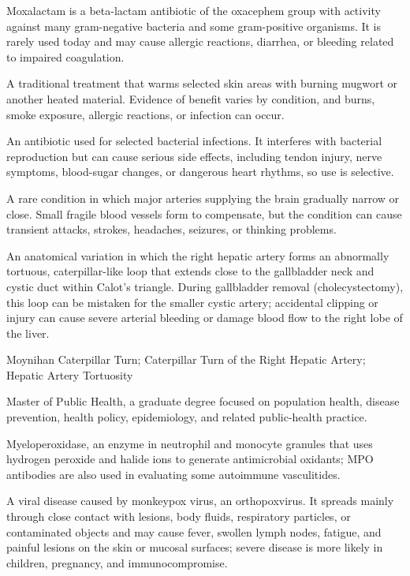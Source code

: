  Moxalactam is a beta-lactam antibiotic of the oxacephem group with activity against many gram-negative bacteria and some gram-positive organisms. It is rarely used today and may cause allergic reactions, diarrhea, or bleeding related to impaired coagulation.

 A traditional treatment that warms selected skin areas with burning mugwort or another heated material. Evidence of benefit varies by condition, and burns, smoke exposure, allergic reactions, or infection can occur.

 An antibiotic used for selected bacterial infections. It interferes with bacterial reproduction but can cause serious side effects, including tendon injury, nerve symptoms, blood-sugar changes, or dangerous heart rhythms, so use is selective.

 A rare condition in which major arteries supplying the brain gradually narrow or close. Small fragile blood vessels form to compensate, but the condition can cause transient attacks, strokes, headaches, seizures, or thinking problems.

 An anatomical variation in which the right hepatic artery forms an abnormally tortuous, caterpillar-like loop that extends close to the gallbladder neck and cystic duct within Calot's triangle. During gallbladder removal (cholecystectomy), this loop can be mistaken for the smaller cystic artery; accidental clipping or injury can cause severe arterial bleeding or damage blood flow to the right lobe of the liver.

\synonyms
Moynihan Caterpillar Turn; Caterpillar Turn of the Right Hepatic Artery; Hepatic Artery Tortuosity

 Master of Public Health, a graduate degree focused on population health, disease prevention, health policy, epidemiology, and related public-health practice.

 Myeloperoxidase, an enzyme in neutrophil and monocyte granules that uses hydrogen peroxide and halide ions to generate antimicrobial oxidants; MPO antibodies are also used in evaluating some autoimmune vasculitides.

 A viral disease caused by monkeypox virus, an orthopoxvirus. It spreads mainly through close contact with lesions, body fluids, respiratory particles, or contaminated objects and may cause fever, swollen lymph nodes, fatigue, and painful lesions on the skin or mucosal surfaces; severe disease is more likely in children, pregnancy, and immunocompromise.

